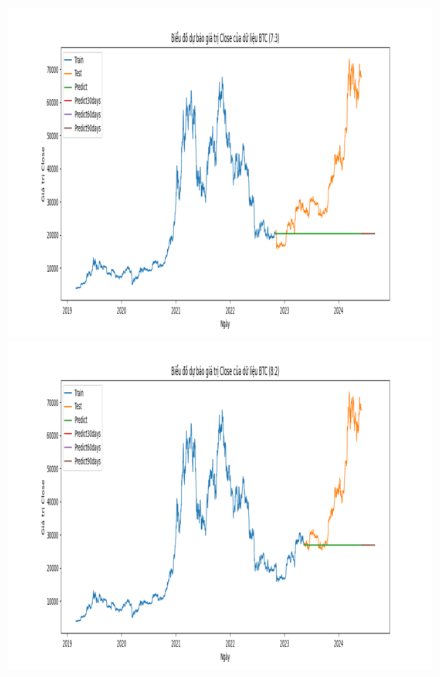 \documentclass[conference]{IEEEtran}
\begin{document}
\begin{figure}[H]
    \centering
    \begin{minipage}{0.15\textwidth}
    \centering
    \includegraphics[width=1\textwidth]{Figure/ARIMA_BTC_73.png}
    \end{minipage}
    \hfill
    \begin{minipage}{0.15\textwidth}
    \centering
    \includegraphics[width=1\textwidth]{Figure/ARIMA_BTC_82.png}
    \end{minipage}
    \hfill
    \begin{minipage}{0.15\textwidth}
    \centering

\end{minipage}
\end{figure}
\end{document}
